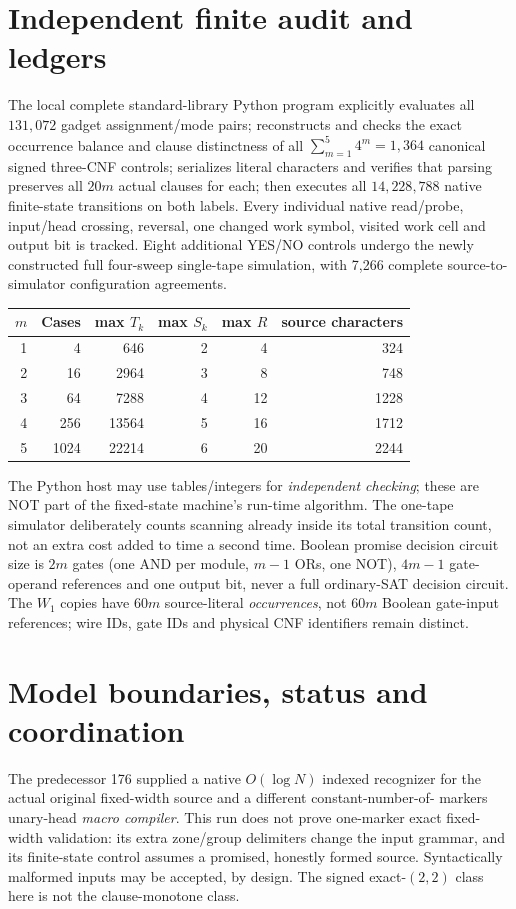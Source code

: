 \documentclass[11pt]{article}
\begin{document}
\section{Independent finite audit and ledgers}
The local complete standard-library Python program explicitly evaluates
all $131{,}072$ gadget assignment/mode pairs; reconstructs and checks the
exact occurrence balance and clause distinctness of all
$\sum_{m=1}^5 4^m=1{,}364$ canonical signed three-CNF controls;
serializes literal characters and verifies that parsing preserves all
$20m$ actual clauses for each; then executes all
$14{,}228{,}788$ native finite-state transitions on both labels. Every
individual native read/probe, input/head crossing, reversal, one changed
work symbol, visited work cell and output bit is tracked. Eight additional
YES/NO controls undergo the newly constructed full four-sweep single-tape
simulation, with 7,266 complete source-to-simulator configuration agreements.
\begin{center}\small
\begin{tabular}{rrrrrr}\toprule
$m$&Cases&max $T_k$&max $S_k$&max $R$&source characters\\\midrule
1&4&646&2&4&324\\
2&16&2964&3&8&748\\
3&64&7288&4&12&1228\\
4&256&13564&5&16&1712\\
5&1024&22214&6&20&2244\\\bottomrule
\end{tabular}
\end{center}
The Python host may use tables/integers for \emph{independent checking};
these are NOT part of the fixed-state machine's run-time algorithm. The
one-tape simulator deliberately counts scanning already inside its total
transition count, not an extra cost added to time a second time. Boolean
promise decision circuit size is $2m$ gates (one AND per module, $m-1$
ORs, one NOT), $4m-1$ gate-operand references and one output bit, never a
full ordinary-SAT decision circuit. The $W_1$ copies have $60m$ source-literal
\emph{occurrences}, not $60m$ Boolean gate-input references; wire IDs,
gate IDs and physical CNF identifiers remain distinct.

\section{Model boundaries, status and coordination}
The predecessor 176 supplied a native $O(\log N)$ indexed recognizer for
the actual original fixed-width source and a different constant-number-of-
markers unary-head \emph{macro compiler}. This run does not prove one-marker
exact fixed-width validation: its extra zone/group delimiters change the
input grammar, and its finite-state control assumes a promised, honestly
formed source. Syntactically malformed inputs may be accepted, by design.
The signed exact-$(2,2)$ class here is not the clause-monotone class.
\end{document}
